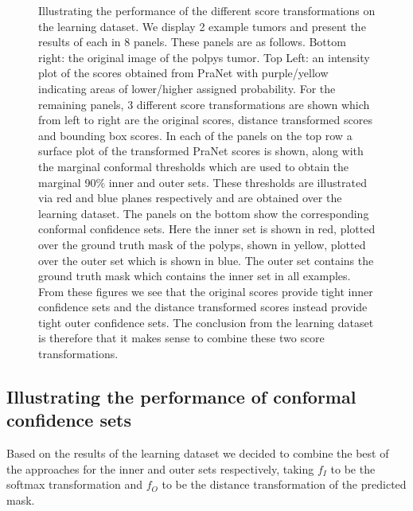 \begin{figure}
	\caption{Illustrating the performance of the different score transformations on the learning dataset. We display 2 example tumors and present the results of each in 8 panels. These panels are as follows. Bottom right: the original image of the polpys tumor. Top Left: an intensity plot of the scores obtained from PraNet with purple/yellow indicating areas of lower/higher assigned probability. For the remaining panels, 3 different score transformations are shown which from left to right are the original scores, distance transformed scores and bounding box scores. In each of the panels on the top row a surface plot of the transformed PraNet scores is shown, along with the marginal conformal thresholds which are used to obtain the marginal 90\% inner and outer sets.  These thresholds are illustrated via red and blue planes respectively and are obtained over the learning dataset. The panels on the bottom show the corresponding conformal confidence sets. Here the inner set is shown in red, plotted over the ground truth mask of the polyps, shown in yellow, plotted over the outer set which is shown in blue. The outer set contains the ground truth mask which contains the inner set in all examples. From these figures we see that the original scores provide tight inner confidence sets and the distance transformed scores instead provide tight outer confidence sets. The conclusion from the learning dataset is therefore that it makes sense to combine these two score transformations.}
	\label{fig:learning}
\end{figure}



\subsection{Illustrating the performance of conformal confidence sets}\label{SS:val}
Based on the results of the learning dataset we decided to combine the best of the approaches for the inner and outer sets respectively, taking $f_I$ to be the softmax transformation and $f_O$ to be the distance transformation of the predicted mask.

